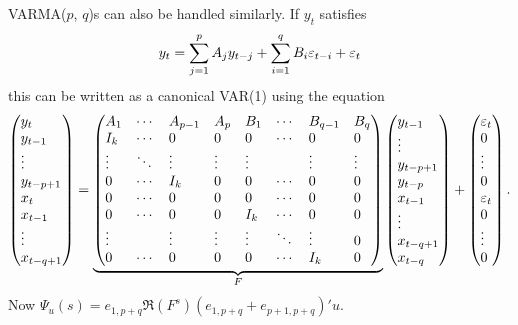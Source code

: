 \documentclass[12pt,fleqn]{article}
\begin{document}
VARMA($p$, $q$)s can also be handled similarly. If $y_t$ satisfies
\begin{equation*}
  y_t = \sum_{j=1}^p A_j y_{t-j} + \sum_{i=1}^q B_i \varepsilon_{t-i} + \varepsilon_t
\end{equation*}
this can be written as a canonical VAR(1) using the equation
\begin{equation*}
\begin{pmatrix*}[l]
  y_t \\ y_{t-1} \\ \vdots \\ y_{t-p+1} \\
  x_t \\ x_{t-1} \\ \vdots \\ x_{t-q+1}
\end{pmatrix*}
=
\underbrace{\begin{pmatrix*}[l]
  A_1    & \cdots & A_{p-1} & A_p    & B_1    & \cdots & B_{q-1} & B_q    \\
  I_k    & \cdots & 0       & 0      & 0      & \cdots & 0       & 0      \\
  \vdots & \ddots & \vdots  & \vdots & \vdots &        & \vdots  & \vdots \\
  0      & \cdots & I_k     & 0      & 0      & \cdots & 0       & 0      \\
  0      & \cdots & 0       & 0      & 0      & \cdots & 0       & 0      \\
  0      & \cdots & 0       & 0      & I_k    & \cdots & 0       & 0      \\
  \vdots &        & \vdots  & \vdots & \vdots & \ddots & \vdots  & 0      \\
  0      & \cdots & 0       & 0      & 0      & \cdots & I_k     & 0      \\
\end{pmatrix*}}_{F}
\begin{pmatrix*}[l]
  y_{t-1} \\ \vdots \\ y_{t-p+1} \\ y_{t-p} \\
  x_{t-1} \\ \vdots \\ x_{t-q+1} \\ x_{t-q}
\end{pmatrix*}
+
\begin{pmatrix*}[l]
  \vep_{t} \\ 0 \\ \vdots \\ 0 \\ \vep_t \\ 0 \\ \vdots \\ 0
\end{pmatrix*}.
\end{equation*}
Now $\Psi_u(s) = e_{1,p+q} \Re(F^s) (e_{1,p+q} + e_{p+1,p+q})' u$.
\end{document}
